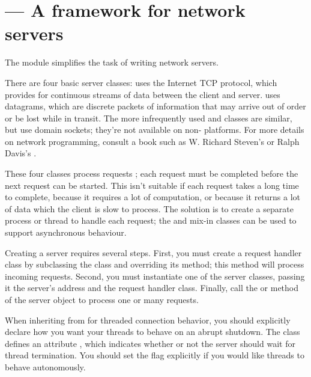 \section{ ---
         A framework for network servers}



The  module simplifies the task of writing network
servers.

There are four basic server classes:  uses the
Internet TCP protocol, which provides for continuous streams of data
between the client and server.   uses datagrams, which
are discrete packets of information that may arrive out of order or be
lost while in transit.  The more infrequently used
 and  classes are
similar, but use \UNIX{} domain sockets; they're not available on
non-\UNIX{} platforms.  For more details on network programming, consult
a book such as W. Richard Steven's 
or Ralph Davis's .

These four classes process requests ; each request
must be completed before the next request can be started.  This isn't
suitable if each request takes a long time to complete, because it
requires a lot of computation, or because it returns a lot of data
which the client is slow to process.  The solution is to create a
separate process or thread to handle each request; the
 and  mix-in classes can be
used to support asynchronous behaviour.

Creating a server requires several steps.  First, you must create a
request handler class by subclassing the 
class and overriding its  method; this method will
process incoming requests.  Second, you must instantiate one of the
server classes, passing it the server's address and the request
handler class.  Finally, call the  or
 method of the server object to process one or
many requests.

When inheriting from  for threaded connection
behavior, you should explicitly declare how you want your threads
to behave on an abrupt shutdown. The  class
defines an attribute , which indicates whether
or not the server should wait for thread termination. You should
set the flag explicitly if you would like threads to behave
autonomously.

